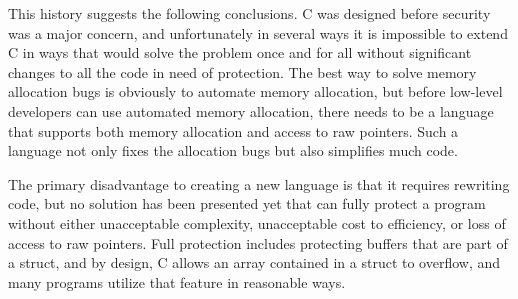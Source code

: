 This history suggests the following conclusions.  C was designed before security was a major concern, and unfortunately
in several ways it is impossible to extend C in ways that would solve the problem once and for all without significant
changes to all the code in need of protection.  The best way to solve memory allocation bugs is obviously to automate
memory allocation, but before low-level developers can use automated memory allocation, there needs to be a language
that supports both memory allocation and access to raw pointers.  Such a language not only fixes the allocation bugs but
also simplifies much code.

The primary disadvantage to creating a new language is that it requires rewriting code, but no solution has been
presented yet that can fully protect a program without either unacceptable complexity, unacceptable cost to efficiency,
or loss of access to raw pointers.  Full protection includes protecting buffers that are part of a struct, and by
design, C allows an array contained in a struct to overflow, and many programs utilize that feature in reasonable ways.
